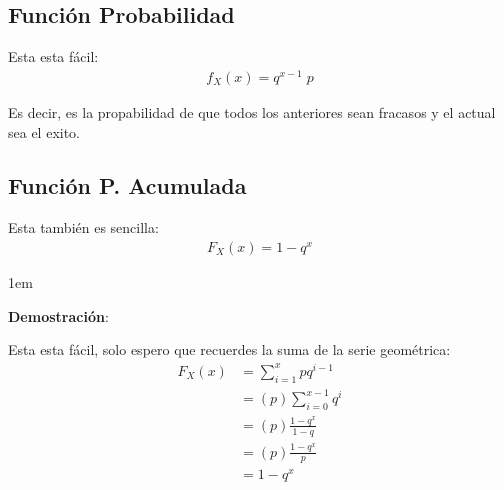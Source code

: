 \documentclass[12pt, fleqn]{report}                             %
\newenvironment{SmallIndentation}[1][0.75em]                    %
        {\begin{adjustwidth}{#1}{}\begin{footnotesize}}             %
        {\end{footnotesize}\end{adjustwidth}}                       %
\theoremstyle{break}                                            %
\begin{document}
            \clearpage
            \subsection{Función Probabilidad}

                Esta esta fácil:
                \begin{align*}
                    f_X(x) = q^{x - 1} \; p
                \end{align*}

                Es decir, es la propabilidad de que todos los anteriores sean
                fracasos y el actual sea el exito.


            \vspace{1em}
            \subsection{Función P. Acumulada}

                Esta también es sencilla:
                \begin{align*}
                    F_X(x) = 1 - q^x
                \end{align*}

                \begin{SmallIndentation}[1em]
                    \textbf{Demostración}:
                    
                    Esta esta fácil, solo espero que recuerdes
                    la suma de la serie geométrica:
                    \begin{align*}
                        F_X(x) 
                            &= \sum_{i=1}^x pq^{i - 1}      \\
                            &= (p)\sum_{i=0}^{x-1} q^i      \\
                            &= (p)\frac{1-q^x}{1-q}         \\
                            &= (p)\frac{1-q^x}{p}           \\
                            &= 1-q^x
                    \end{align*}
                
                \end{SmallIndentation}
                    
\end{document}

